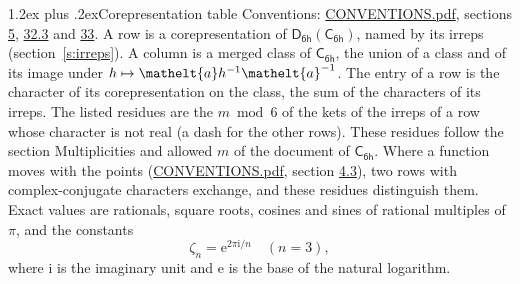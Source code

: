 \documentclass[10pt,a4paper]{article}
\makeatletter
\renewcommand\section{\@startsection{section}{1}{\z@}{-3ex plus -1ex minus -.2ex}%
  {1.2ex plus .2ex}{\normalfont\large\sffamily\bfseries\color{parttitle}}}
\numberwithin{equation}{section}
\newcommand{\eltfont}[1]{{\let\sigma\eltsigma\mathelt{#1}}}
\newcommand{\grp}[1]{\mathsf{#1}}
\newcommand{\elt}[1]{\eltfont{#1}}
\newcommand{\iunit}{\mathrm{i}}
\newcommand{\expe}{\mathrm{e}}
\newcommand{\rootunity}[1]{\zeta_{#1}}
\makeatother
\begin{document}
\section{Corepresentation table}\label{s:character_table}
Conventions: \href{../../CONVENTIONS.pdf}{CONVENTIONS.pdf}, sections \href{../../../rotation/CONVENTIONS.pdf\#conv.5}{5}, \href{../../CONVENTIONS.pdf\#conv.32.3}{32.3} and \href{../../CONVENTIONS.pdf\#conv.33}{33}.
A row is a corepresentation of $\grp{D_{6h}}(\grp{C_{6h}})$, named by its irreps (section~\ref{s:irreps}). A column is a merged class of $\grp{C_{6h}}$, the union of a class and of its image under $h \mapsto \elt{a} h^{-1} \elt{a}^{-1}$. The entry of a row is the character of its corepresentation on the class, the sum of the characters of its irreps.
\leavevmode\label{n:head.parity}The listed residues are the $m \bmod 6$ of the kets of the irreps of a row whose character is not real (a dash for the other rows). These residues follow the section Multiplicities and allowed $m$ of the document of \href{../../../rotation/data/pdf/C6h.pdf}{$\grp{C_{6h}}$}. Where a function moves with the points (\href{../../CONVENTIONS.pdf}{CONVENTIONS.pdf}, section \href{../../../rotation/CONVENTIONS.pdf\#conv.4.3}{4.3}), two rows with complex-conjugate characters exchange, and these residues distinguish them.
\leavevmode\label{n:constant.root}\label{n:index.root.order}Exact values are rationals, square roots, cosines and sines of rational multiples of $\pi$, and the constants
\begin{equation}\label{e:constants}\rootunity{n} = \expe^{2\pi\iunit/n}\quad(n = 3),\end{equation}
where $\iunit$ is the imaginary unit and $\expe$ is the base of the natural logarithm.
\end{document}
